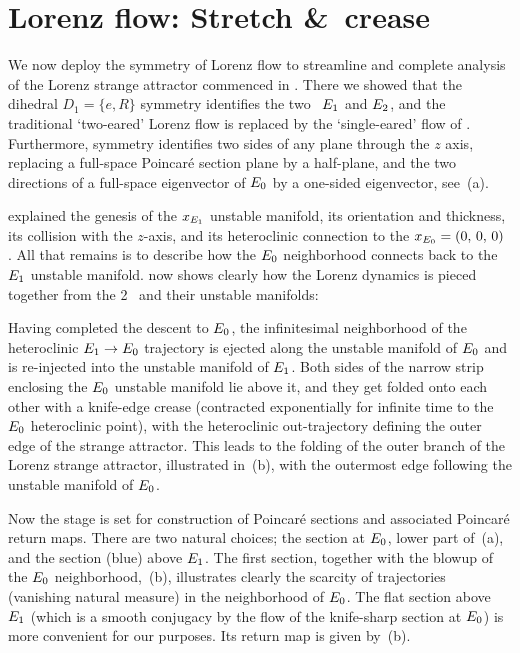 \section{Lorenz flow: Stretch \&\ crease\label{exmp:LorenzRetM}}
We now deploy the symmetry of Lorenz flow
to streamline and complete analysis of the Lorenz strange attractor
commenced in  . There we showed that
the dihedral $D_1 = \{e,R\}$ symmetry identifies the
two \eqva\ $E_{1}$ and $E_{2}$,
and the traditional `two-eared' Lorenz flow
 is replaced by
the `single-eared' flow
of .
Furthermore, symmetry identifies two sides of any plane
through the $z$ axis, replacing a full-space Poincar\'e
section plane by a half-plane, and the two directions
of a full-space eigen\-vector of $E_{0}$
 by a one-sided eigen\-vector, see \,(a).

 explained the genesis of the
$x_{E_{1}}$ {\eqv} unstable manifold, its orientation and
thickness, its collision with the $z$-axis, and its
heteroclinic connection to the $x_{E_{0}} = (0,\, 0,\, 0)$
{\eqv}. All that remains is to describe how the $E_{0}$
neighborhood connects back to the $E_{1}$ unstable
manifold.  now shows clearly how the
Lorenz dynamics is pieced together from the 2 \eqva\ and their
unstable manifolds:

Having completed the descent to  $E_{0}$, the
infinitesimal neighborhood of the heteroclinic $E_{1} \to
E_{0}$ trajectory is ejected along the unstable manifold
of $E_{0}$ and is re-injected into the unstable manifold
of $E_{1}$. Both sides of the narrow strip enclosing the
$E_{0}$ unstable manifold  lie above it, and they get
folded onto each other with a knife-edge crease (contracted
exponentially for infinite time to the  $E_{0}$
heteroclinic point), with the heteroclinic out-trajectory
defining the outer edge of the strange attractor. This leads to
the folding of the outer branch of the Lorenz strange
attractor, illustrated in \,(b), with
the outermost edge following the unstable manifold of
$E_{0}$.

Now the stage is set for construction of  Poincar\'e sections
and associated  Poincar\'e return maps. There are two natural
choices; the section at $E_{0}$, lower part of
\,(a), and the section (blue) above
$E_{1}$. The first section, together with the blowup of
the $E_{0}$ neighborhood, \,(b),
illustrates clearly the scarcity of trajectories (vanishing
natural measure) in the neighborhood of $E_{0}$. The flat
section above $E_{1}$ (which is a
smooth conjugacy by the flow of the knife-sharp section at
$E_{0}$) is more convenient for our purposes. Its return
map is given by \,(b).

